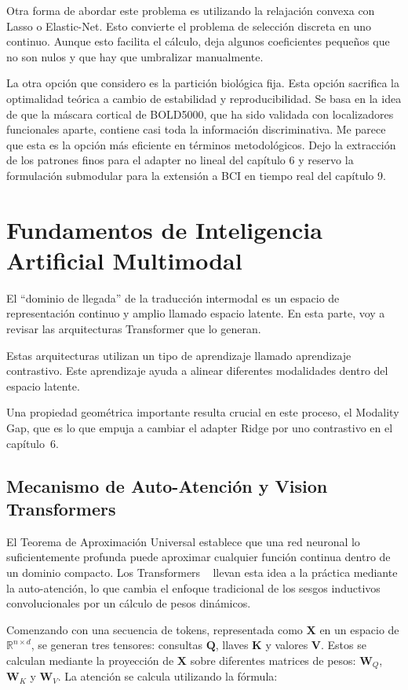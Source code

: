 Otra forma de abordar este problema es utilizando la relajación convexa con Lasso o Elastic-Net. Esto convierte el problema de selección discreta en uno continuo. Aunque esto facilita el cálculo, deja algunos coeficientes pequeños que no son nulos y que hay que umbralizar manualmente.

La otra opción que considero es la partición biológica fija. Esta opción sacrifica la optimalidad teórica a cambio de estabilidad y reproducibilidad. Se basa en la idea de que la máscara cortical de BOLD5000, que ha sido validada con localizadores funcionales aparte, contiene casi toda la información discriminativa. Me parece que esta es la opción más eficiente en términos metodológicos. Dejo la extracción de los patrones finos para el adapter no lineal del capítulo 6 y reservo la formulación submodular para la extensión a BCI en tiempo real del capítulo 9.


\section{Fundamentos de Inteligencia Artificial Multimodal}

El “dominio de llegada” de la traducción intermodal es un espacio de representación continuo y amplio llamado espacio latente. En esta parte, voy a revisar las arquitecturas Transformer que lo generan.

Estas arquitecturas utilizan un tipo de aprendizaje llamado aprendizaje contrastivo. Este aprendizaje ayuda a alinear diferentes modalidades dentro del espacio latente.

Una propiedad geométrica importante resulta crucial en este proceso, el Modality Gap, que es lo que empuja a cambiar el adapter 
Ridge por uno contrastivo en el capítulo~6.

\subsection{Mecanismo de Auto-Atención y Vision Transformers}

El Teorema de Aproximación Universal establece que una red neuronal lo suficientemente profunda puede 
aproximar cualquier función continua dentro de un dominio compacto. Los Transformers ~\cite{vaswani2017attention} 
llevan esta idea a la práctica mediante la auto-atención, lo que cambia el enfoque tradicional de los 
sesgos inductivos convolucionales por un cálculo de pesos dinámicos.

Comenzando con una secuencia de tokens, representada como $\mathbf{X}$ en un espacio de 
$\mathbb{R}^{n\times d}$, se generan tres tensores: consultas $\mathbf{Q}$, llaves $\mathbf{K}$ y 
valores $\mathbf{V}$. Estos se calculan mediante la proyección de $\mathbf{X}$ sobre diferentes matrices 
de pesos: $\mathbf{W}_Q$, $\mathbf{W}_K$ y $\mathbf{W}_V$. La atención se calcula utilizando la fórmula:

